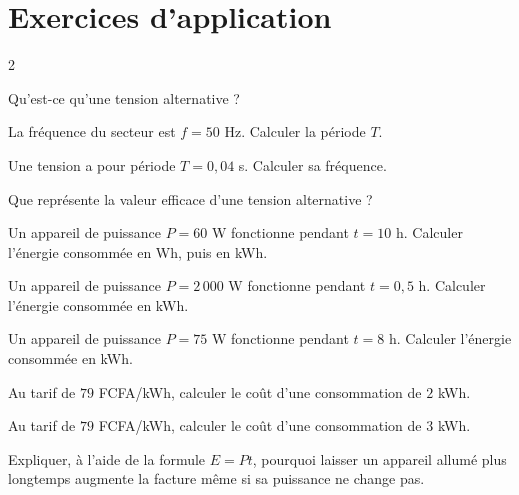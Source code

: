 \section{Exercices d'application}
\begin{multicols}{2}

\exo{} Qu'est-ce qu'une tension alternative ?

\exo{} La fréquence du secteur est $f=50$ Hz. Calculer la période $T$.

\exo{} Une tension a pour période $T=0{,}04$ s. Calculer sa fréquence.

\exo{} Que représente la valeur efficace d'une tension alternative ?

\exo{} Un appareil de puissance $P=60$ W fonctionne pendant $t=10$ h. Calculer
l'énergie consommée en Wh, puis en kWh.

\exo{} Un appareil de puissance $P=2\,000$ W fonctionne pendant $t=0{,}5$ h.
Calculer l'énergie consommée en kWh.

\exo{} Un appareil de puissance $P=75$ W fonctionne pendant $t=8$ h. Calculer
l'énergie consommée en kWh.

\exo{} Au tarif de $79$ FCFA/kWh, calculer le coût d'une consommation de $2$ kWh.

\exo{} Au tarif de $79$ FCFA/kWh, calculer le coût d'une consommation de $3$ kWh.

\exo{} Expliquer, à l'aide de la formule $E=Pt$, pourquoi laisser un appareil
allumé plus longtemps augmente la facture même si sa puissance ne change pas.

\end{multicols}

